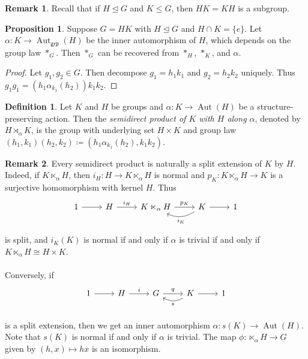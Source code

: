 \documentclass[10pt,letterpaper,cm]{nupset}
\theoremstyle{definition}
\newtheorem*{definition}{Definition}
\newtheorem{remark}{Remark}
\newtheorem{prop}{Proposition}
\newcommand{\1}{\mathbf{1}}
\newcommand{\0}{\vec 0}
\DeclareMathOperator{\aut}{Aut}
\begin{document}
\begin{remark}
Recall that if $H \unlhd G$ and $K \leq G$, then $HK = KH$ is a subgroup.
\end{remark}

\begin{prop}
Suppose $G = HK$ with $H\unlhd G$ and $H \cap K = \{e\}$. Let $\alpha : K \to \aut_{\mathsf{grp}}(H)$ be the inner automorphism of $H$, which depends on the group law $*_G$. Then $*_G$ can be recovered from $*_H$, $*_K$, and $\alpha$.
\end{prop}
\begin{proof}
Let $g_1, g_2 \in G$. Then decompose $g_1 = h_1k_1$ and $g_2= h_2k_2$ uniquely. Thus $g_1g_1 = (h_1\alpha_{k_1}(h_2))k_1k_2$.
\end{proof}

\begin{definition}
Let $K$ and $H$ be groups and $\alpha : K \to \aut(H)$ be a structure-preserving action. Then the \textit{semidirect product of $K$ with $H$ along $\alpha$}, denoted by $H \rtimes_{\alpha} K$, is the group with underlying set $H \times K$ and group law $(h_1, k_1)(h_2, k_2) \coloneqq  (h_1 \alpha_{k_1}(h_2), k_1k_2)$.
\end{definition}

\begin{remark}
Every semidirect product is naturally a split extension of $K$ by $H$. Indeed, if $K \ltimes_{\alpha} H$, then $i_H : H \to K \ltimes_{\alpha} H$ is normal and $p_K : K\ltimes_{\alpha} H \to K$ is a surjective homomorphism with kernel $H$. Thus \[
	\begin{tikzcd}
	1\rar &H\rar["i_H" above] & K\ltimes_{\alpha} H \rar["p_K" above] & K\rar\lar[bend left=30,"i_K" below] & 1 \\
	\end{tikzcd}
\] is split, and $i_K(K)$ is normal  if and only if $\alpha$ is trivial if and only if $K \ltimes_{\alpha} H \cong H \times K$.
\\ \\ Conversely, if 
\[
	\begin{tikzcd}
	1\rar &H\rar["i" above] & G \rar["q" above] & K\rar\lar[bend left=30,"s" below] & 1 \\
	\end{tikzcd}
\]
is a split extension, then we get an inner automorphism $\alpha : s(K) \to \aut(H)$. Note that $s(K)$ is normal if and only if $\alpha$ is trivial. The map $\phi : \ltimes_{\alpha} H \to G$ given by $(h,x) \mapsto hx$ is an isomorphism.
\end{remark}
\end{document}
